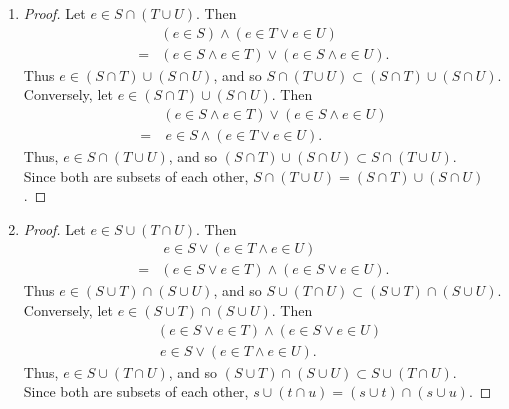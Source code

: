 \documentclass{homework}
\begin{document}
\begin{solution}
\begin{enumerate}[label=(\alph*)]
  \item
    \begin{proof}[Proof]
      Let $e\in S\cap \left( T\cup U \right) $. Then
      \begin{align*}
        &\left( e\in S \right) \land \left( e\in T \lor e\in U \right) \\
        = &\left( e\in S\land e\in T \right) \lor \left( e\in S\land e\in U \right)
      .\end{align*}
      Thus $e\in \left( S\cap T \right) \cup \left( S\cap U \right)$, and so $S\cap \left( T\cup U 
        \right) \subset \left( S\cap T \right) \cup \left( S\cap U \right) $.\\
      Conversely, let $e\in \left( S\cap T \right) \cup \left( S\cap U \right)$. Then
      \begin{align*}
        &\left( e\in S\land e\in T \right) \lor \left( e\in S\land e\in U \right) \\
        = &~e\in S\land \left(e\in T\lor e\in U\right)
      .\end{align*}
      Thus, $e\in S\cap \left( T\cup U \right)$, and so $\left( S\cap T
      \right) \cup \left( S\cap U \right) \subset S\cap \left( T\cup U \right) $. \\
      Since both are subsets of each other, $S\cap \left( T\cup U \right) = \left( S\cap T
      \right)\cup \left( S\cap U \right) $.
    \end{proof}
    
  \item
    \begin{proof}[Proof]
      Let $e\in S\cup \left( T\cap U \right)$. Then
      \begin{align*}
        &~e\in S\lor \left( e\in T\land e\in U \right) \\
        = &\left( e\in S\lor e\in T \right) \land \left( e\in S\lor e\in U \right)
      .\end{align*}
      Thus $e\in \left( S\cup T \right) \cap \left( S\cup U \right)$, and so $S\cup \left( T\cap U
        \right) \subset \left( S\cup T \right) \cap \left( S\cup U \right) $. \\
        Conversely, let $e\in \left( S\cup T \right) \cap \left( S\cup U \right)$. Then 
        \begin{align*}
          &\left( e\in S\lor e\in T \right) \land \left( e\in S\lor e\in U \right) \\
          &~e\in S\lor \left( e\in T\land e\in U \right)
        .\end{align*}
      Thus, $e\in S\cup \left( T\cap U \right)$, and so $\left( S\cup T \right) \cap \left( S\cup U 
      \right) \subset S\cup \left( T\cap U \right) $.\\
      Since both are subsets of each other, $s\cup \left( t\cap u \right) = \left( s\cup t \right)
      \cap \left( s\cup u \right).$
    \end{proof}


\end{enumerate}
\end{solution}
\end{document}

